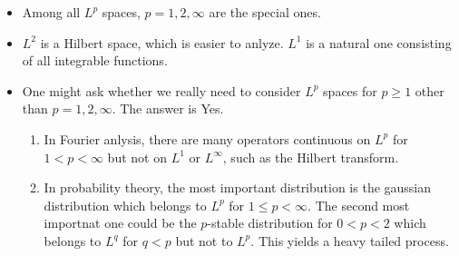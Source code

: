 \documentclass[12pt]{article}
\begin{document}
\begin{itemize}
    \begin{itemize}
        \item Among all $L^p$ spaces, $p=1,2,\infty$ are the special ones.
        \item $L^2$ is a Hilbert space, which is easier to anlyze. $L^1$ is a natural one consisting of all integrable functions.
        \item One might ask whether we really need to consider $L^p$ spaces for $p\geq 1$ other than $p=1,2,\infty$. The answer is Yes.
        \begin{enumerate}
            \item In Fourier anlysis, there are many operators continuous on $L^p$ for $1<p<\infty$ but not on $L^1$ or $L^\infty$, such as the Hilbert transform.
            \item In probability theory, the most important distribution is the gaussian distribution  which belongs to $L^p$ for $1\leq p<\infty$. The second most importnat one could be the $p$-stable distribution for $0<p<2$ which belongs to $L^q$ for $q<p$ but not to $L^p$. This yields a heavy tailed process.
        \end{enumerate}
    \end{itemize}
\end{itemize}
\bigskip
\end{document}
